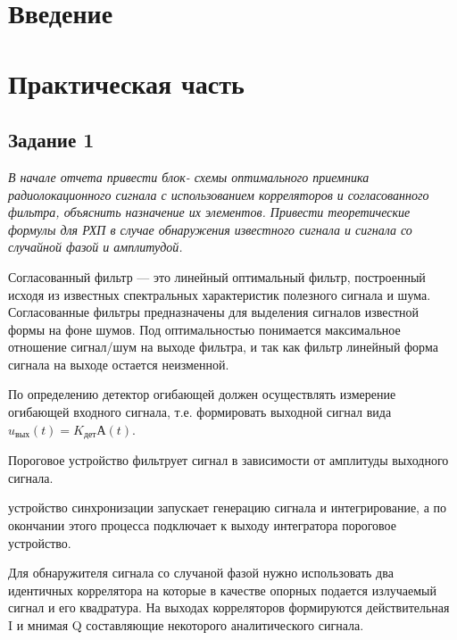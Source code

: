 


\def\labauthors{Шиков А.П.}
\def\labgroup{0420ДМР1Г}
\def\labnumber{1}
\def\labtheme{Исследование рабочих характеристик оптимального обнаружителя сложных радиолокационных сигналов.}



\section{Введение}
\section{Практическая часть}
\subsection{Задание 1}
\textit{В начале отчета привести блок- схемы оптимального приемника
радиолокационного сигнала с использованием корреляторов и
согласованного фильтра, объяснить назначение их элементов. Привести
теоретические формулы для РХП в случае обнаружения известного
сигнала и сигнала со случайной фазой и амплитудой.}


Согласованный фильтр — это линейный оптимальный фильтр, построенный исходя из известных
спектральных характеристик полезного сигнала и шума. Согласованные фильтры предназначены
для выделения сигналов известной формы на фоне шумов. Под оптимальностью понимается
максимальное отношение сигнал/шум на выходе фильтра, и так как фильтр линейный форма
сигнала на выходе остается неизменной.

По определению детектор огибающей  должен осуществлять измерение огибающей входного сигнала,
т.е. формировать выходной сигнал вида $u_{\text{вых}}(t) = K_\text{дет}А(t)$.

Пороговое устройство фильтрует сигнал в зависимости от амплитуды выходного сигнала.

устройство синхронизации запускает генерацию сигнала и интегрирование, а по
окончании этого процесса подключает к выходу интегратора пороговое
устройство.

Для обнаружителя сигнала со случаной фазой нужно использовать два идентичных коррелятора
на которые в качестве опорных подается излучаемый сигнал и его квадратура. На выходах
корреляторов формируются действительная I и мнимая Q составляющие некоторого
аналитического сигнала.  



